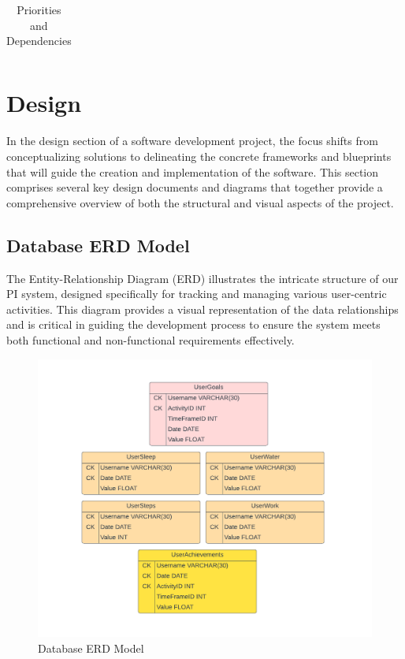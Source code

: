 \documentclass[12pt]{article}
\begin{document}
\begin{table}[!ht]
\begin{center}
\begin{tabular}{|l|c|c|c|}
\end{tabular}
\caption{Priorities and Dependencies}
\label{tab:priorities_dependencies}
\end{center}
\end{table}


\newpage
\section{Design}

In the design section of a software development project, the focus shifts from
conceptualizing solutions to delineating the concrete frameworks and blueprints
that will guide the creation and implementation of the software. This section 
comprises several key design documents and diagrams that together provide a 
comprehensive overview of both the structural and visual aspects of the project.\par

\subsection{Database ERD Model}

The Entity-Relationship Diagram (ERD) illustrates the intricate structure of
our PI system, designed specifically for tracking and managing various
user-centric activities. This diagram provides a visual representation of the
data relationships and is critical in guiding the development process to ensure
the system meets both functional and non-functional requirements
effectively.\par


\begin{figure}[!ht]
  \centering
  \includegraphics[width = 0.7\linewidth]{PI Systems Database}
  \caption{Database ERD Model}
  \label{fig:PI_ERD}
\end{figure}
\end{document}
